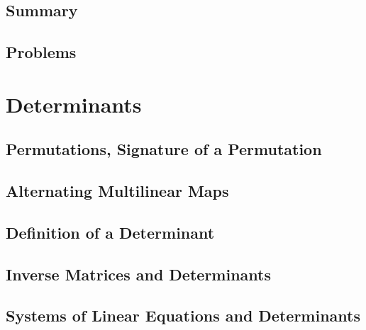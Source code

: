 \documentclass[a4paper]{article}
\begin{document}
\subsection{ Summary} %

\subsection{ Problems} %


\newpage
\section{Determinants}
\subsection{ Permutations, Signature of a Permutation} %

\subsection{ Alternating Multilinear Maps} %

\subsection{ Definition of a Determinant} %

\subsection{ Inverse Matrices and Determinants} %

\subsection{ Systems of Linear Equations and Determinants} %
\end{document}
